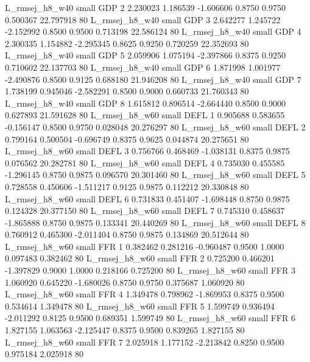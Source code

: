 L_rmsej_h8_w40      small      GDP                 2 2.230023 1.186539 -1.606606 0.8750 0.9750  0.500367   22.797918 80
L_rmsej_h8_w40      small      GDP                 3 2.642277 1.245722 -2.152992 0.8500 0.9500  0.713198   22.586124 80
L_rmsej_h8_w40      small      GDP                 4 2.300335 1.154882 -2.295345 0.8625 0.9250  0.720259   22.352693 80
L_rmsej_h8_w40      small      GDP                 5 2.059906 1.075194 -2.397866 0.8375 0.9250  0.710602   22.137703 80
L_rmsej_h8_w40      small      GDP                 6 1.871998 1.001977 -2.490876 0.8500 0.9125  0.688180   21.946208 80
L_rmsej_h8_w40      small      GDP                 7 1.738199 0.945046 -2.582291 0.8500 0.9000  0.660733   21.760343 80
L_rmsej_h8_w40      small      GDP                 8 1.615812 0.896514 -2.664440 0.8500 0.9000  0.627893   21.591628 80
L_rmsej_h8_w60      small     DEFL                 1 0.905688 0.583655 -0.156147 0.8500 0.9750  0.028048   20.276297 80
L_rmsej_h8_w60      small     DEFL                 2 0.799164 0.500504 -0.696749 0.8375 0.9625  0.044874   20.275651 80
L_rmsej_h8_w60      small     DEFL                 3 0.756766 0.468469 -1.038131 0.8375 0.9875  0.076562   20.282781 80
L_rmsej_h8_w60      small     DEFL                 4 0.735030 0.455585 -1.296145 0.8750 0.9875  0.096570   20.301460 80
L_rmsej_h8_w60      small     DEFL                 5 0.728558 0.450606 -1.511217 0.9125 0.9875  0.112212   20.330848 80
L_rmsej_h8_w60      small     DEFL                 6 0.731833 0.451407 -1.698448 0.8750 0.9875  0.124328   20.377150 80
L_rmsej_h8_w60      small     DEFL                 7 0.745310 0.458637 -1.865888 0.8750 0.9875  0.133341   20.440269 80
L_rmsej_h8_w60      small     DEFL                 8 0.760912 0.465300 -2.011404 0.8750 0.9875  0.134869   20.512644 80
L_rmsej_h8_w60      small      FFR                 1 0.382462 0.281216 -0.960487 0.9500 1.0000  0.097483    0.382462 80
L_rmsej_h8_w60      small      FFR                 2 0.725200 0.466201 -1.397829 0.9000 1.0000  0.218166    0.725200 80
L_rmsej_h8_w60      small      FFR                 3 1.060920 0.645220 -1.680026 0.8750 0.9750  0.375687    1.060920 80
L_rmsej_h8_w60      small      FFR                 4 1.349478 0.798962 -1.869953 0.8375 0.9500  0.534614    1.349478 80
L_rmsej_h8_w60      small      FFR                 5 1.599749 0.936494 -2.011292 0.8125 0.9500  0.689351    1.599749 80
L_rmsej_h8_w60      small      FFR                 6 1.827155 1.063563 -2.125447 0.8375 0.9500  0.839265    1.827155 80
L_rmsej_h8_w60      small      FFR                 7 2.025918 1.177152 -2.213842 0.8250 0.9500  0.975184    2.025918 80
